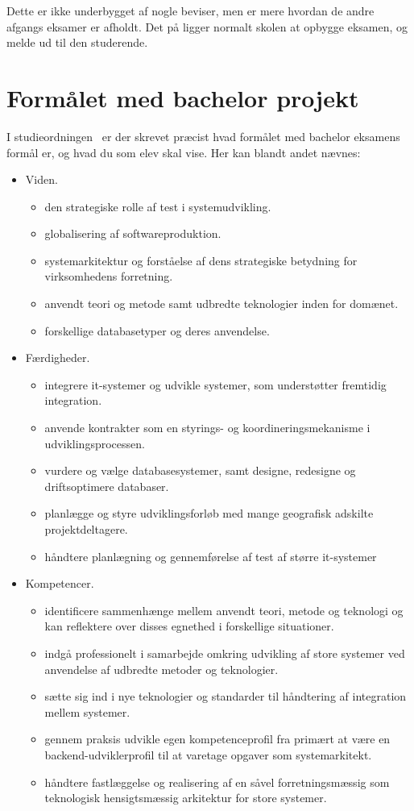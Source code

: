 \documentclass{article}
\begin{document}
Dette er ikke underbygget af nogle beviser, men er mere hvordan de andre afgangs eksamer er afholdt.
Det på ligger normalt skolen at opbygge eksamen, og melde ud til den studerende.

\section{Formålet med bachelor projekt}
I studieordningen~\cite{studie} er der skrevet præcist hvad formålet med bachelor eksamens formål er, og hvad du som elev skal vise. Her kan blandt andet nævnes:


\begin{itemize}
  \item Viden.
	\begin{itemize}
	\item den strategiske rolle af test i systemudvikling.
	\item globalisering af softwareproduktion.
	\item systemarkitektur og forståelse af dens strategiske betydning for virksomhedens forretning.
	\item anvendt teori og metode samt udbredte teknologier inden for domænet.
	\item forskellige databasetyper og deres anvendelse.
	\end{itemize}
  \item Færdigheder.
	\begin{itemize}
	\item integrere it-systemer og udvikle systemer, som understøtter fremtidig integration.
	\item anvende kontrakter som en styrings- og koordineringsmekanisme i udviklingsprocessen.
	\item vurdere og vælge databasesystemer, samt designe, redesigne og driftsoptimere databaser.
	\item planlægge og styre udviklingsforløb med mange geografisk adskilte projektdeltagere.
	\item håndtere planlægning og gennemførelse af test af større it-systemer
	\end{itemize}
  \item Kompetencer.
	\begin{itemize}
	\item identificere sammenhænge mellem anvendt teori, metode og teknologi og kan reflektere over disses egnethed i forskellige situationer.
	\item indgå professionelt i samarbejde omkring udvikling af store systemer ved anvendelse af udbredte metoder og teknologier.
	\item sætte sig ind i nye teknologier og standarder til håndtering af integration mellem systemer.
	\item gennem praksis udvikle egen kompetenceprofil fra primært at være en backend-udviklerprofil til at varetage opgaver som systemarkitekt.
	\item håndtere fastlæggelse og realisering af en såvel forretningsmæssig som teknologisk hensigtsmæssig arkitektur for store systemer.
	\end{itemize}
\end{itemize}



\end{document}
